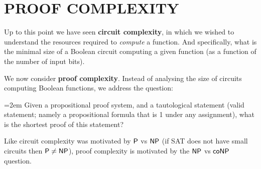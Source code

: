 \chapter{PROOF COMPLEXITY}

Up to this point we have  seen \textbf{circuit complexity}, in which we wished to understand the resources required to \emph{compute} a function. And specifically, what is the minimal size of a Boolean circuit computing a given function (as a function of the number of input bits).

We now consider \textbf{proof complexity}. Instead of analysing the size of circuits computing Boolean
functions, we address the question:



\bigskip

\noindent
\hangindent=2em
Given a propositional proof system, and a tautological
statement (valid statement; namely a propositional
formula that is 1 under any assignment), what is the
shortest proof of this statement?

\bigskip


Like circuit complexity was motivated by $\P$ vs $\NP$ (if SAT
does not have small circuits then $\P \neq \NP$), proof
complexity is motivated by the $\NP$ vs $\coNP$ question.


